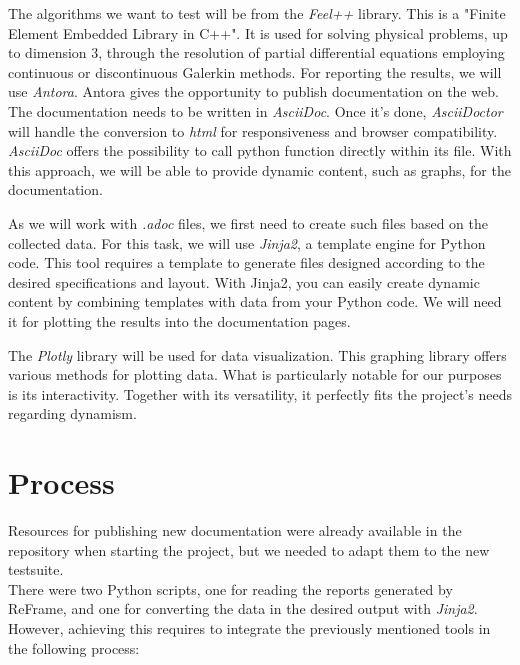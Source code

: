 \documentclass[12pt]{article}
\begin{document}
The algorithms we want to test will be from the \textit{Feel++}\cite*{Feelpp} library.
This is a "Finite Element Embedded Library in C++". It is used for solving physical problems, up to dimension 3,
through the resolution of partial differential equations employing continuous or discontinuous Galerkin methods.
\newpage
For reporting the results, we will use \textit{Antora}\cite*{Antora}. Antora gives the opportunity to publish documentation on the web.
The documentation needs to be written in \textit{AsciiDoc}. Once it's done, \textit{AsciiDoctor} will handle the conversion to \textit{html}
for responsiveness and browser compatibility.
\textit{AsciiDoc} offers the possibility to call python function directly within its file. With this approach, we will be able to provide dynamic content,
such as graphs, for the documentation.

As we will work with \textit{.adoc} files, we first need to create such files based on the collected data.
For this task, we will use \textit{Jinja2}\cite*{Jinja2}, a template engine for Python code.
This tool requires a template to generate files designed according to the desired specifications and layout.
With Jinja2, you can easily create dynamic content by combining templates with data from your Python code.
We will need it for plotting the results into the documentation pages.


The \textit{Plotly}\cite*{Plotly} library will be used for data visualization. This graphing library offers various methods for plotting data.
What is particularly notable for our purposes is its interactivity. Together with its versatility, it perfectly fits the project's needs
regarding dynamism.


\section{Process}
Resources for publishing new documentation were already available in the repository when starting the project, but we needed to adapt them to the new testsuite.\\
There were two Python scripts, one for reading the reports generated by ReFrame, and one for converting the data in the desired output with \textit{Jinja2}. \\
However, achieving this requires to integrate the previously mentioned tools in the following process:
\end{document}
